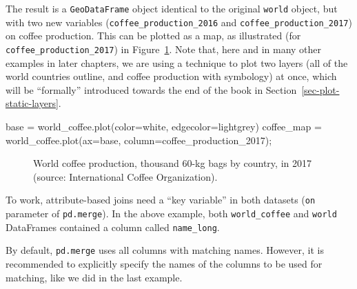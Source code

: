 \documentclass[
  letterpaper,
]{krantz}
\newenvironment{Shaded}{\begin{snugshade}}{\end{snugshade}}
\newcommand{\NormalTok}[1]{\textcolor[rgb]{0.00,0.23,0.31}{#1}}
\newcommand{\OperatorTok}[1]{\textcolor[rgb]{0.37,0.37,0.37}{#1}}
\newcommand{\StringTok}[1]{\textcolor[rgb]{0.13,0.47,0.30}{#1}}
\begin{document}
The result is a \texttt{GeoDataFrame} object identical to the original
\texttt{world} object, but with two new variables
(\texttt{coffee\_production\_2016} and
\texttt{coffee\_production\_2017}) on coffee production. This can be
plotted as a map, as illustrated (for \texttt{coffee\_production\_2017})
in Figure~\ref{fig-join-coffee-production}. Note that, here and in many
other examples in later chapters, we are using a technique to plot two
layers (all of the world countries outline, and coffee production with
symbology) at once, which will be ``formally'' introduced towards the
end of the book in Section~\ref{sec-plot-static-layers}.

\begin{Shaded}
\begin{Highlighting}[]
\NormalTok{base }\OperatorTok{=}\NormalTok{ world\_coffee.plot(color}\OperatorTok{=}\StringTok{\textquotesingle{}white\textquotesingle{}}\NormalTok{, edgecolor}\OperatorTok{=}\StringTok{\textquotesingle{}lightgrey\textquotesingle{}}\NormalTok{)}
\NormalTok{coffee\_map }\OperatorTok{=}\NormalTok{ world\_coffee.plot(ax}\OperatorTok{=}\NormalTok{base, column}\OperatorTok{=}\StringTok{\textquotesingle{}coffee\_production\_2017\textquotesingle{}}\NormalTok{)}\OperatorTok{;}
\end{Highlighting}
\end{Shaded}

\begin{figure}[H]


\caption{\label{fig-join-coffee-production}World coffee production,
thousand 60-kg bags by country, in 2017 (source: International Coffee
Organization).}

\end{figure}%

To work, attribute-based joins need a ``key variable'' in both datasets
(\texttt{on} parameter of \texttt{pd.merge}). In the above example, both
\texttt{world\_coffee} and \texttt{world} DataFrames contained a column
called \texttt{name\_long}.

\begin{tcolorbox}[enhanced jigsaw, title=\textcolor{quarto-callout-note-color}{\faInfo}\hspace{0.5em}{Note}, coltitle=black, colbacktitle=quarto-callout-note-color!10!white, breakable, titlerule=0mm, colframe=quarto-callout-note-color-frame, opacitybacktitle=0.6, colback=white, bottomrule=.15mm, left=2mm, leftrule=.75mm, toprule=.15mm, toptitle=1mm, bottomtitle=1mm, arc=.35mm, opacityback=0, rightrule=.15mm]

By default, \texttt{pd.merge} uses all columns with matching names.
However, it is recommended to explicitly specify the names of the
columns to be used for matching, like we did in the last example.

\end{tcolorbox}
\end{document}
